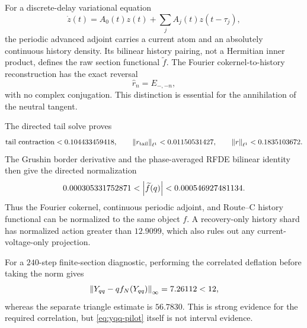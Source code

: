 For a discrete-delay variational equation
\[
 \dot z(t)=A_0(t)z(t)+\sum_j A_j(t)z(t-\tau_j),
\]
the periodic advanced adjoint carries a current atom and an absolutely
continuous history density.  Its bilinear history pairing, not a Hermitian
inner product, defines the raw section functional \(\widetilde f\).  The Fourier
cokernel-to-history reconstruction has the exact reversal
\begin{equation}
 \widehat r_n=E_{-,-n},                                \label{eq:fourier-reversal}
\end{equation}
with no complex conjugation.  This distinction is essential for the
annihilation of the neutral tangent.

The directed tail solve proves
\begin{equation}
 \text{tail contraction}<0.104433459418,\qquad
 \left\lVert r_{\rm tail}\right\rVert_{\ell^1}<0.01150531427,\qquad
 \left\lVert r\right\rVert_{\ell^1}<0.1835103672.                        \label{eq:adjoint-tail}
\end{equation}
The Grushin border derivative and the phase-averaged RFDE bilinear identity
then give the directed normalization
\begin{equation}
 0.000305331752871<\left\lvert\widetilde f(q)\right\rvert
 <0.000546927481134.                                   \label{eq:fq-bound}
\end{equation}
Thus the Fourier cokernel, continuous periodic adjoint, and Route--C
history functional can be normalized to the same object \(f\).  A recovery-only
history shard has normalized action greater than \(12.9099\), which also
rules out any current-voltage-only projection.

For a \(240\)-step finite-section diagnostic, performing the correlated
deflation before taking the norm gives
\begin{equation}
 \left\lVert Y_{qq}-qf_N(Y_{qq})\right\rVert_\infty=7.26112<12,          \label{eq:yqq-pilot}
\end{equation}
whereas the separate triangle estimate is \(56.7830\).  This is strong
evidence for the required correlation, but \cref{eq:yqq-pilot} itself is
not interval evidence.

